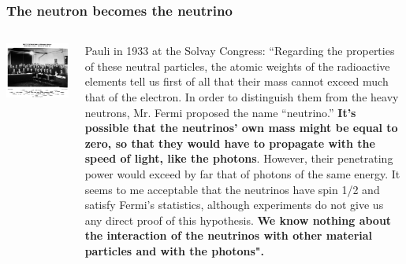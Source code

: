 \begin{frame}
\frametitle{The neutron becomes the neutrino}
\begin{columns}
\includegraphics[scale=0.18]{img/Solvay1933Large.jpg}
 
Pauli in  1933 at the Solvay Congress: ``Regarding the properties of these neutral particles, the atomic weights
of the radioactive elements tell us first of all that their mass cannot exceed
much that of the electron. In order to distinguish them from the heavy
neutrons, Mr. Fermi proposed the name ``neutrino.'' {\bf It's possible that the
neutrinos' own mass might be equal to zero, so that they would have to
propagate with the speed of light, like the photons}. However, their penetrating power would exceed by far that of photons of the same energy. It
seems to me acceptable that the neutrinos have spin 1/2 and satisfy Fermi's 
statistics, although experiments do not give us any direct proof of this hypothesis. 
{\bf We know nothing about the interaction of the neutrinos with other material particles and with the photons".}

\end{columns}
\end{frame}